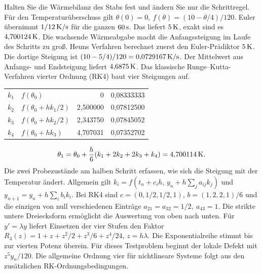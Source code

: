 Halten Sie die Wärmebilanz des Stabs fest und ändern Sie nur die Schrittregel. Für den Temperaturüberschuss gilt \(\theta(0)=0,\ f(\theta)=(10-\theta/4)/120\). Euler übernimmt \(1/12\,\mathrm{K/s}\) für die ganzen \(60\,\mathrm{s}\). Das liefert \(5\,\mathrm{K}\), exakt sind es \(4{,}700124\,\mathrm{K}\). Die wachsende Wärmeabgabe macht die Anfangssteigung im Laufe des Schritts zu groß.
Heuns Verfahren berechnet zuerst den Euler-Prädiktor \(5\,\mathrm{K}\). Die dortige Steigung ist \((10-5/4)/120=0{,}0729167\,\mathrm{K/s}\). Der Mittelwert aus Anfangs- und Endsteigung liefert \(4{,}6875\,\mathrm{K}\). Das klassische Runge--Kutta-Verfahren vierter Ordnung (RK4) baut vier Steigungen auf.
{\tblstart\begin{tabularx}{\linewidth}{@{}lYrr@{}}\toprule
{}&&&\\\midrule
\(k_1\)& \(f(\theta_0)\)&0&0,08333333\\
\(k_2\)& \(f(\theta_0+hk_1/2)\)&2,500000&0,07812500\\
\(k_3\)& \(f(\theta_0+hk_2/2)\)&2,343750&0,07845052\\
\(k_4\)& \(f(\theta_0+hk_3)\)&4,707031&0,07352702\\\bottomrule
\end{tabularx}\par}
\[
 \theta_1=\theta_0+\frac h6(k_1+2k_2+2k_3+k_4)=4{,}700114\,\mathrm{K} .
\]
Die zwei Probezustände am halben Schritt erfassen, wie sich die Steigung mit der Temperatur ändert.
Allgemein gilt \(k_i=f(t_n+c_i h,\,y_n+h\sum_j a_{ij}k_j)\) und \(y_{n+1}=y_n+h\sum_i b_i k_i\). Bei RK4 sind \(c=(0,1/2,1/2,1)\), \(b=(1,2,2,1)/6\) und die einzigen von null verschiedenen Einträge \(a_{21}=a_{32}=1/2,\ a_{43}=1\). Die strikte untere Dreiecksform ermöglicht die Auswertung von oben nach unten.
Für \(y'=\lambda y\) liefert Einsetzen der vier Stufen den Faktor \(R_4(z)=1+z+z^2/2+z^3/6+z^4/24\), \(z=h\lambda\). Die Exponentialreihe stimmt bis zur vierten Potenz überein. Für dieses Testproblem beginnt der lokale Defekt mit \(z^5y_n/120\). Die allgemeine Ordnung vier für nichtlineare Systeme folgt aus den zusätzlichen RK-Ordnungsbedingungen.

